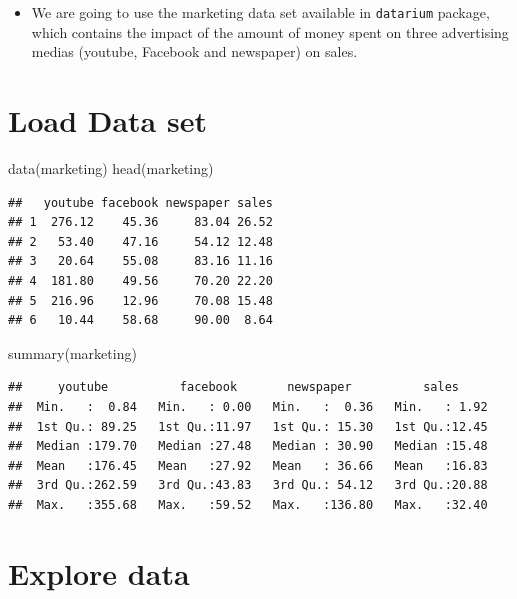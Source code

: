 \documentclass[
]{book}
\newenvironment{Shaded}{\begin{snugshade}}{\end{snugshade}}
\newcommand{\FunctionTok}[1]{\textcolor[rgb]{0.00,0.00,0.00}{#1}}
\newcommand{\NormalTok}[1]{#1}
\providecommand{\tightlist}{%
  \setlength{\itemsep}{0pt}\setlength{\parskip}{0pt}}
\begin{document}
\begin{itemize}
\tightlist
\item
  We are going to use the marketing data set available in \texttt{datarium} package, which contains the impact of the amount of money spent on three advertising medias (youtube, Facebook and newspaper) on sales.
\end{itemize}

\hypertarget{load-data-set}{%
\section{Load Data set}\label{load-data-set}}

\begin{Shaded}
\begin{Highlighting}[]
\FunctionTok{data}\NormalTok{(marketing)}
\FunctionTok{head}\NormalTok{(marketing)}
\end{Highlighting}
\end{Shaded}

\begin{verbatim}
##   youtube facebook newspaper sales
## 1  276.12    45.36     83.04 26.52
## 2   53.40    47.16     54.12 12.48
## 3   20.64    55.08     83.16 11.16
## 4  181.80    49.56     70.20 22.20
## 5  216.96    12.96     70.08 15.48
## 6   10.44    58.68     90.00  8.64
\end{verbatim}

\begin{Shaded}
\begin{Highlighting}[]
\FunctionTok{summary}\NormalTok{(marketing)}
\end{Highlighting}
\end{Shaded}

\begin{verbatim}
##     youtube          facebook       newspaper          sales      
##  Min.   :  0.84   Min.   : 0.00   Min.   :  0.36   Min.   : 1.92  
##  1st Qu.: 89.25   1st Qu.:11.97   1st Qu.: 15.30   1st Qu.:12.45  
##  Median :179.70   Median :27.48   Median : 30.90   Median :15.48  
##  Mean   :176.45   Mean   :27.92   Mean   : 36.66   Mean   :16.83  
##  3rd Qu.:262.59   3rd Qu.:43.83   3rd Qu.: 54.12   3rd Qu.:20.88  
##  Max.   :355.68   Max.   :59.52   Max.   :136.80   Max.   :32.40
\end{verbatim}

\hypertarget{explore-data}{%
\section{Explore data}\label{explore-data}}
\end{document}
